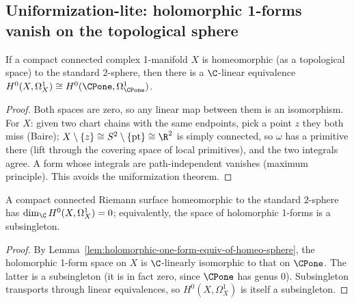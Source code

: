 \subsection{Uniformization-lite: holomorphic 1-forms vanish on the topological sphere}
\label{sec:uniformization-lite}

\begin{lemma}
\label{lem:holomorphic-one-form-equiv-of-homeo-sphere}
If a compact connected complex 1-manifold \(X\) is homeomorphic
(as a topological space) to the standard \(2\)-sphere, then there
is a \(\C\)-linear equivalence
\(H^{0}(X,\Omega^{1}_{X})\cong H^{0}(\CPone,\Omega^{1}_{\CPone})\).
\leanok
\end{lemma}
\begin{proof}\leanok
Both spaces are zero, so any linear map between them is an isomorphism. For
\(X\): given two chart chains with the same endpoints, pick a point \(z\) they
both miss (Baire); \(X\setminus\{z\}\cong S^2\setminus\{\mathrm{pt}\}\cong\R^2\)
is simply connected, so \(\omega\) has a primitive there (lift through the
covering space of local primitives), and the two integrals agree. A form whose
integrals are path-independent vanishes (maximum principle). This avoids the
uniformization theorem.
\end{proof}

\begin{theorem}
\label{thm:homeo-sphere-holomorphic-one-form-vanishing}
A compact connected Riemann surface homeomorphic to the standard
\(2\)-sphere has \(\dim_{\C}H^{0}(X,\Omega^{1}_{X})=0\); equivalently,
the space of holomorphic 1-forms is a subsingleton.
\leanok
\end{theorem}
\begin{proof}\leanok
By Lemma~\ref{lem:holomorphic-one-form-equiv-of-homeo-sphere}, the
holomorphic 1-form space on \(X\) is \(\C\)-linearly isomorphic to
that on \(\CPone\). The latter is a subsingleton (it is in fact
zero, since \(\CPone\) has genus 0). Subsingleton transports
through linear equivalences, so \(H^{0}(X,\Omega^{1}_{X})\) is
itself a subsingleton.
\end{proof}

